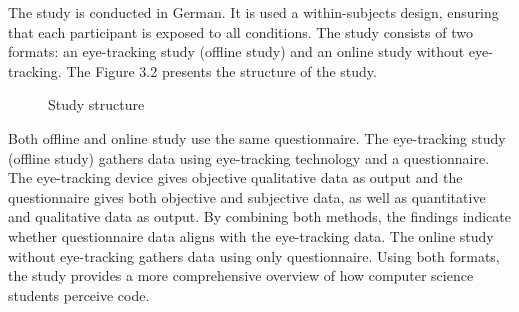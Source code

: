 The study is conducted in German. It is used a within-subjects design, ensuring that each participant is exposed to all conditions.
The study consists of two formats: an eye-tracking study (offline study) and an online study without eye-tracking. The Figure 3.2 presents the structure of the study. 
\begin{figure}[H]
  \centering
  \caption{Study structure}
  \label{fig:AnhangsChor}

\end{figure}


Both offline and online study use the same questionnaire. The eye-tracking study (offline study) gathers data using eye-tracking technology and a questionnaire. The eye-tracking device gives objective qualitative data as output and the questionnaire gives both objective and subjective data, as well as quantitative and qualitative data as output.  By combining both methods, the findings indicate whether questionnaire data aligns with the eye-tracking data.
The online study without eye-tracking gathers data using only questionnaire.  Using both formats, the study provides a more comprehensive overview of how computer science students perceive code. 



